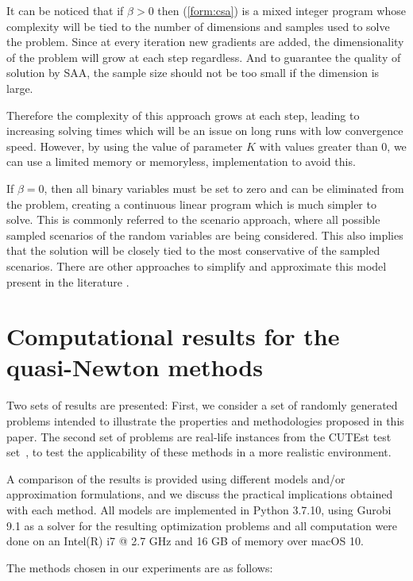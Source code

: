 \documentclass[11pt,twoside]{article}
\def\AFcomment#1{{\color{red}\emph{AF: #1}}}
\begin{document}
It can be noticed that if $\beta > 0$ then (\ref{form:csa}) is a mixed
integer program whose complexity will be tied to the number of
dimensions and samples used to solve the problem.  Since at every
iteration new gradients are added, the dimensionality of the problem
will grow at each step regardless. And to guarantee the quality of
solution by SAA, the sample size should not be too small if the
dimension is large.

Therefore the complexity of this approach grows at each step, leading
to increasing solving times which will be an issue on long runs with
low convergence speed. However, by using the value of parameter $K$
with values greater than 0, we can use a limited memory or memoryless,
implementation to avoid this.

If $\beta  = 0$, then all binary variables must be set to zero and can
be eliminated from the problem, creating a continuous linear program which is much simpler to solve. This is commonly referred to the scenario approach, where all possible sampled scenarios of the random variables are being considered. This also implies that the solution will be closely tied to the most conservative of the sampled scenarios. There are other approaches to simplify and approximate this model present in the literature \cite{Ahm18}.


\section{Computational results for the quasi-Newton methods}



Two sets of results are presented: First, we consider a set of randomly generated problems intended to illustrate the properties and methodologies proposed in this paper. The second set of problems are real-life instances from the CUTEst test set~\cite{GOT15}, to test the applicability of these methods in a more realistic environment.

A comparison of the results is provided using different models and/or approximation formulations, and we discuss the practical implications obtained with each method. All models are implemented in Python 3.7.10, using Gurobi 9.1 as a solver for the resulting optimization problems and all computation were done on an Intel(R) i7 @ 2.7 GHz and 16 GB of memory over macOS 10.

The methods chosen in our experiments are as follows:
\end{document}
